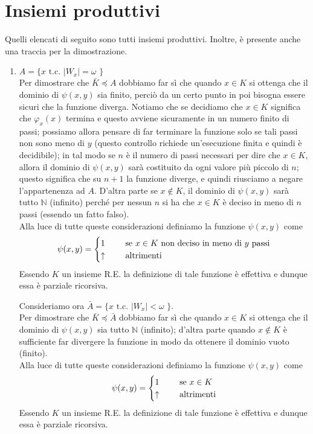 \documentclass[a4paper,oneside,titlepage]{book}
\begin{document}
\section{Insiemi produttivi}
Quelli elencati di seguito sono tutti insiemi produttivi. Inoltre, è presente anche una traccia per la dimostrazione.
\begin{enumerate}[label=\fbox{\arabic*}]
\item $A = \text{\{ } x \text{ t.c. } |W_x| = \omega \text{ \}}$
\\ Per dimostrare che $\bar{K} \preceq A$ dobbiamo far sì che quando $x \in K$ si ottenga che il dominio di $\psi(x,y)$ sia finito, perciò da un certo punto in poi bisogna essere sicuri che la funzione diverga. Notiamo che se decidiamo che $x \in K$ significa che $\varphi_x(x)$ termina e questo avviene sicuramente in un numero finito di passi; possiamo allora pensare di far terminare la funzione solo se tali passi non sono meno di $y$ (questo controllo richiede un'esecuzione finita e quindi è decidibile); in tal modo se $n$ è il numero di passi necessari per dire che $x \in K$, allora il dominio di $\psi(x,y)$ sarà costituito da ogni valore più piccolo di $n$; questo significa che su $n + 1$ la funzione diverge, e quindi riusciamo a negare l'appartenenza ad $A$. D'altra parte se $x \notin K$, il dominio di $\psi(x,y)$ sarà tutto $\mathbb{N}$ (infinito) perché per nessun $n$ si ha che $x \in K$ è deciso in meno di $n$ passi (essendo un fatto falso).		
\\ Alla luce di tutte queste considerazioni definiamo la funzione $\psi(x,y)$ come
\[
\psi(x,y) =
\begin{cases}
1& \hspace{0.5cm} \text{se } x \in K \text{ non deciso in meno di $y$ passi} \\
\uparrow& \hspace{0.5cm} \text{altrimenti}
\end{cases}
\]
Essendo $K$ un insieme R.E. la definizione di tale funzione è effettiva e dunque essa è parziale ricorsiva.

Consideriamo ora $\bar{A} = \text{\{ } x \text{ t.c. } |W_x| < \omega \text{ \}}$.
\\ Per dimostrare che $\bar{K} \preceq \bar{A}$ dobbiamo far sì che quando $x \in K$ si ottenga che il dominio di $\psi(x,y)$ sia tutto $\mathbb{N}$ (infinito); d'altra parte quando $x \notin K$ è sufficiente far divergere la funzione in modo da ottenere il dominio vuoto (finito).
\\ Alla luce di tutte queste considerazioni definiamo la funzione $\psi(x,y)$ come
\[
\psi(x,y) =
\begin{cases}
1& \hspace{0.5cm} \text{se } x \in K \\
\uparrow& \hspace{0.5cm} \text{altrimenti}
\end{cases}
\]
Essendo $K$ un insieme R.E. la definizione di tale funzione è effettiva e dunque essa è parziale ricorsiva.


\end{enumerate}
\end{document}
